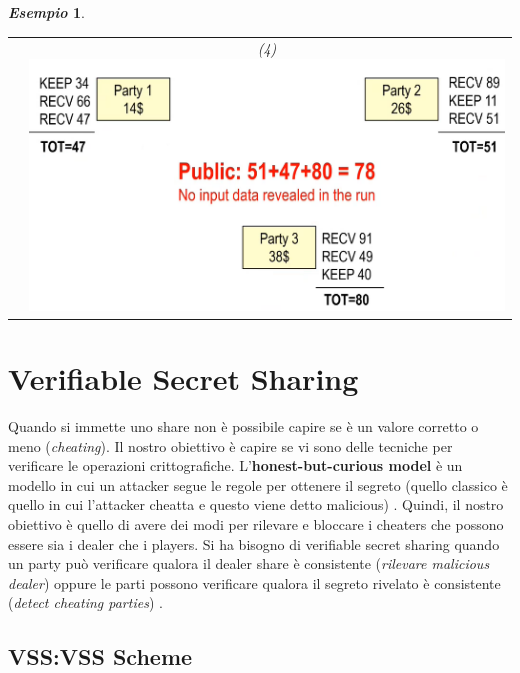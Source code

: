 \documentclass{book}
\newtheorem{esempio}{\emph{Esempio}}
\begin{document}
\begin{esempio}
\begin{tabular}{c c}
		 &
		(4)\includegraphics[scale=0.5]{2021-12-29-23-47-08.png}%
		\\
	\end{tabular}
\end{esempio}
\chapter{Verifiable Secret Sharing}
Quando si immette uno share non è possibile capire se è un valore corretto o meno (\emph{cheating})\@. Il nostro obiettivo è capire se vi sono delle tecniche per verificare le operazioni crittografiche\@.\newline
L'\textbf{honest-but-curious model} è un modello in cui un attacker segue le regole per ottenere il segreto (quello classico è quello in cui l'attacker cheatta e questo viene detto malicious) \@. Quindi, il nostro obiettivo è quello di avere dei modi per rilevare e bloccare i cheaters che possono essere sia i dealer che i players\@.\newline
Si ha bisogno di verifiable secret sharing quando un party può verificare qualora il dealer share è consistente (\emph{rilevare malicious dealer}) oppure le parti possono verificare qualora il segreto rivelato è consistente (\emph{detect cheating parties}) \@.
\section{VSS:\@Feldman VSS Scheme}
\end{document}
